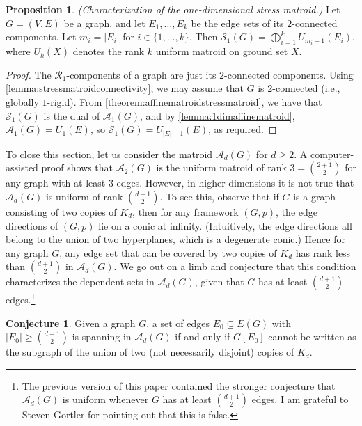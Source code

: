 \documentclass[11pt,a4paper,dvipsnames]{scrartcl}
\theoremstyle{definition}
\newtheorem{conjecture}[theorem]{Conjecture}
\newtheorem{proposition}[theorem]{Proposition}
\newcommand{\stressmatroid}[2]{\mathcal{S}_{#1}(#2)}
\newcommand{\affinematroid}[2]{\mathcal{A}_{#1}(#2)}
\newcommand{\globrig}[1]{globally $#1$-rigid}
\begin{document}
\begin{proposition}\label{theorem:1dimstressmatroid}\emph{(Characterization of the one-dimensional stress matroid.)}\newline
    Let $G = (V,E)$ be a graph, and let $E_1,\ldots,E_k$ be the edge sets of its $2$-connected components. Let $m_i = |E_i|$ for $i \in \{1,\ldots,k\}$. Then $\stressmatroid{1}{G} = \bigoplus_{i=1}^k U_{m_i-1}(E_i)$, where $U_{k}(X)$ denotes the rank $k$ uniform matroid on ground set $X$. 
\end{proposition}
\begin{proof}
    The $\mathcal{R}_1$-components of a graph are just its $2$-connected components. Using \cref{lemma:stressmatroidconnectivity}, we may assume that $G$ is $2$-connected (i.e., \globrig{1}). From \cref{theorem:affinematroidstressmatroid}, we have that $\stressmatroid{1}{G}$ is the dual of $\affinematroid{1}{G}$, and by \cref{lemma:1dimaffinematroid}, $\affinematroid{1}{G} = U_1(E)$, so $\stressmatroid{1}{G} = U_{|E|-1}(E)$, as required. 
\end{proof}

To close this section, let us consider the matroid $\affinematroid{d}{G}$ for $d \geq 2$.
A computer-assisted proof shows that $\affinematroid{2}{G}$ is the uniform matroid of rank $3 = \binom{2+1}{2}$ for any graph with at least $3$ edges. However, in higher dimensions it is not true that $\affinematroid{d}{G}$ is uniform of rank $\binom{d+1}{2}$. To see this, observe that if $G$ is a graph consisting of two copies of $K_d$, then for any framework $(G,p)$, the edge directions of $(G,p)$ lie on a conic at infinity. (Intuitively, the edge directions all belong to the union of two hyperplanes, which is a degenerate conic.) Hence for any graph $G$, any edge set that can be covered by two copies of $K_d$ has rank less than $\binom{d+1}{2}$ in $\affinematroid{d}{G}$. We go out on a limb and conjecture that this condition characterizes the dependent sets in $\affinematroid{d}{G}$, given that $G$ has at least $\binom{d+1}{2}$ edges.\footnote{The previous version of this paper contained the stronger conjecture that $\affinematroid{d}{G}$ is uniform whenever $G$ has at least $\binom{d+1}{2}$ edges. I am grateful to Steven Gortler for pointing out that this is false.} 

\begin{conjecture}\label{conj:affinematroid}
    Given a graph $G$, a set of edges $E_0 \subseteq E(G)$ with $|E_0| \geq \binom{d+1}{2}$ is spanning in $\affinematroid{d}{G}$ if and only if $G[E_0]$ cannot be written as the subgraph of the union of two (not necessarily disjoint) copies of $K_d$.
\end{conjecture}
\end{document}
